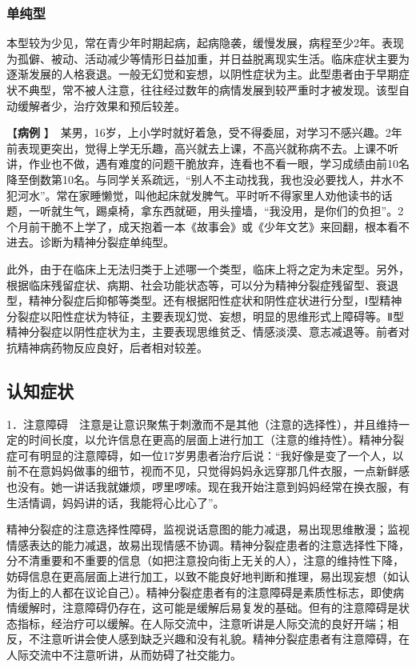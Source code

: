 \subsubsection{单纯型}

本型较为少见，常在青少年时期起病，起病隐袭，缓慢发展，病程至少2年。表现为孤僻、被动、活动减少等情形日益加重，并日益脱离现实生活。临床症状主要为逐渐发展的人格衰退。一般无幻觉和妄想，以阴性症状为主。此型患者由于早期症状不典型，常不被人注意，往往经过数年的病情发展到较严重时才被发现。该型自动缓解者少，治疗效果和预后较差。

【\textbf{病例}
】　{某男，16岁，上小学时就好着急，受不得委屈，对学习不感兴趣。2年前表现更突出，觉得上学无乐趣，高兴就去上课，不高兴就称病不去。上课不听讲，作业也不做，遇有难度的问题干脆放弃，连看也不看一眼，学习成绩由前10名降至倒数第10名。与同学关系疏远，``别人不主动找我，我也没必要找人，井水不犯河水''。常在家睡懒觉，叫他起床就发脾气。平时听不得家里人劝他读书的话题，一听就生气，踢桌椅，拿东西就砸，用头撞墙，``我没用，是你们的负担''。2个月前干脆不上学了，成天抱着一本《故事会》或《少年文艺》来回翻，根本看不进去。诊断为精神分裂症单纯型。}

此外，由于在临床上无法归类于上述哪一个类型，临床上将之定为未定型。另外，根据临床残留症状、病期、社会功能状态等，可以分为精神分裂症残留型、衰退型，精神分裂症后抑郁等类型。还有根据阳性症状和阴性症状进行分型，Ⅰ型精神分裂症以阳性症状为特征，主要表现幻觉、妄想，明显的思维形式上障碍等。Ⅱ型精神分裂症以阴性症状为主，主要表现思维贫乏、情感淡漠、意志减退等。前者对抗精神病药物反应良好，后者相对较差。

\subsection{认知症状}

1．注意障碍　注意是让意识聚焦于刺激而不是其他（注意的选择性），并且维持一定的时间长度，以允许信息在更高的层面上进行加工（注意的维持性）。精神分裂症可有明显的注意障碍，如一位17岁男患者治疗后说：``我好像是变了一个人，以前不在意妈妈做事的细节，视而不见，只觉得妈妈永远穿那几件衣服，一点新鲜感也没有。她一讲话我就嫌烦，啰里啰嗦。现在我开始注意到妈妈经常在换衣服，有生活情调，妈妈讲的话，我能将心比心了''。

精神分裂症的注意选择性障碍，监视说话意图的能力减退，易出现思维散漫；监视情感表达的能力减退，故易出现情感不协调。精神分裂症患者的注意选择性下降，分不清重要和不重要的信息（如把注意投向街上无关的人），注意的维持性下降，妨碍信息在更高层面上进行加工，以致不能良好地判断和推理，易出现妄想（如认为街上的人都在议论自己）。精神分裂症患者有的注意障碍是素质性标志，即使病情缓解时，注意障碍仍存在，这可能是缓解后易复发的基础。但有的注意障碍是状态指标，经治疗可以缓解。在人际交流中，注意听讲是人际交流的良好开端；相反，不注意听讲会使人感到缺乏兴趣和没有礼貌。精神分裂症患者有注意障碍，在人际交流中不注意听讲，从而妨碍了社交能力。

